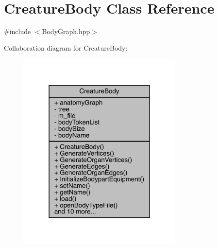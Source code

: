 \hypertarget{class_creature_body}{}\section{Creature\+Body Class Reference}
\label{class_creature_body}


{\ttfamily \#include $<$Body\+Graph.\+hpp$>$}



Collaboration diagram for Creature\+Body\+:
\nopagebreak
\begin{figure}[H]
\begin{center}
\leavevmode
\includegraphics[width=235pt]{db/dc0/class_creature_body__coll__graph}
\end{center}
\end{figure}
